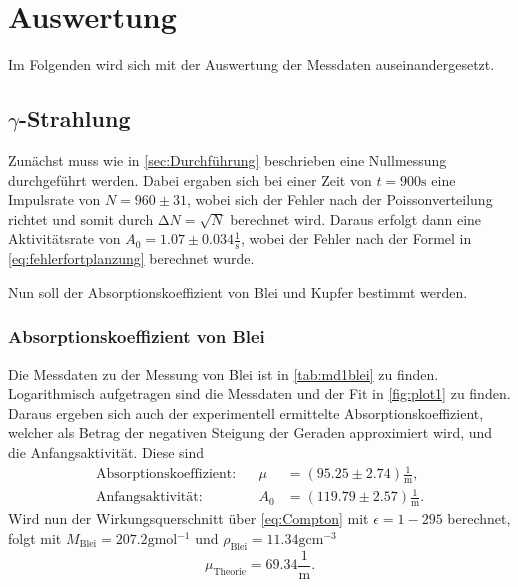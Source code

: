\section{Auswertung}
\label{sec:Auswertung}

Im Folgenden wird sich mit der Auswertung der Messdaten auseinandergesetzt.

\subsection[Gamma-Strahlung]{$\gamma$-Strahlung}

Zunächst muss wie in \ref{sec:Durchführung} beschrieben eine Nullmessung durchgeführt werden.
Dabei ergaben sich bei einer Zeit von $t = 900 \unit\second$ eine Impulsrate von $N = 960 \pm 31$,
wobei sich der Fehler nach der Poissonverteilung richtet und somit durch $\increment N = \sqrt{N}$ berechnet wird.
Daraus erfolgt dann eine Aktivitätsrate von $A_0 = 1.07 \pm 0.034 \frac{1}{\unit\second}$, wobei der Fehler nach
der Formel in \autoref{eq:fehlerfortplanzung} berechnet wurde.

Nun soll der Absorptionskoeffizient von Blei und Kupfer bestimmt werden.

\subsubsection*{Absorptionskoeffizient von Blei}

Die Messdaten zu der Messung von Blei ist in \autoref{tab:md1blei} zu finden.
Logarithmisch aufgetragen sind die Messdaten und der Fit in \autoref{fig:plot1} zu finden.
Daraus ergeben sich auch der experimentell ermittelte Absorptionskoeffizient, welcher als Betrag der negativen Steigung der Geraden approximiert wird, und die Anfangsaktivität.
Diese sind
\begin{align*}
    \text{Absorptionskoeffizient:} && \mu &= (95.25 \pm 2.74) \frac{1}{\unit\meter},\\
    \text{Anfangsaktivität:} && A_0 &= (119.79 \pm 2.57) \frac{1}{\unit\meter}.
\end{align*} 
Wird nun der Wirkungsquerschnitt über \autoref{eq:Compton} mit $\epsilon = 1-295$ berechnet,
folgt mit $M_\text{Blei} = 207.2 \unit{\gram\mol^{-1}}$ \cite{molaremasse} und $ \rho_\text{Blei} = 11.34 \unit{\gram\centi\meter^{-3}}$
\begin{equation}
    \mu_\text{Theorie} = 69.34 \frac{1}{\unit\meter}.
\end{equation}


